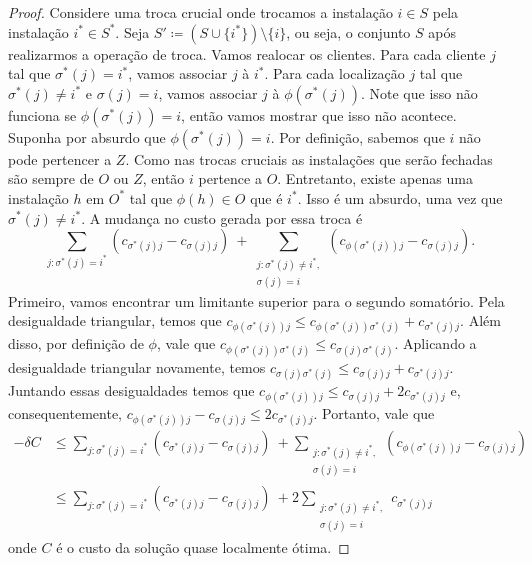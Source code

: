 \begin{proof}
Considere uma troca crucial onde trocamos a instalação $i \in S$ pela instalação $ i^* \in S^*$. Seja $S' \coloneqq (S \cup \{i^*\})\setminus \{i\}$, ou seja, o conjunto $S$ após realizarmos a operação de troca. Vamos realocar os clientes. Para cada cliente $j$ tal que $\sigma^*(j) = i^*$, vamos associar $j$ à $i^*$. Para cada localização $j$ tal que $\sigma^*(j) \neq i^*$ e $\sigma(j)=i$, vamos associar $j$ à $\phi(\sigma^*(j))$. Note que isso não funciona se $\phi(\sigma^*(j)) = i$, então vamos mostrar que isso não acontece. Suponha por absurdo que $\phi(\sigma^*(j))=i$. Por definição, sabemos que $i$ não pode pertencer a $Z$. Como nas trocas cruciais as instalações que serão fechadas são sempre de $O$ ou $Z$, então $i$ pertence a $O$. Entretanto, existe apenas uma instalação $h$ em $O^*$ tal que $\phi(h) \in O$ que é $i^*$. Isso é um absurdo, uma vez que $\sigma^*(j) \neq i^*$. A mudança no custo gerada por essa troca é 
\[ \sum_{j:\sigma^*(j) = i^*} (c_{\sigma^*(j)j} - c_{\sigma(j)j}) \ + \sum_{\substack{j : \sigma^*(j)\neq i^*,\\ \sigma(j) = i}} (c_{\phi(\sigma^*(j))j} - c_{\sigma(j)j}).\]
Primeiro, vamos encontrar um limitante superior para o segundo somatório. Pela desigualdade triangular, temos que $c_{\phi(\sigma^*(j))j} \leq c_{\phi(\sigma^*(j))\sigma^*(j)}+c_{\sigma^*(j)j}$. Além disso, por definição de $\phi$, vale que $c_{\phi(\sigma^*(j))\sigma^*(j)}\leq c_{\sigma(j)\sigma^*(j)}$. Aplicando a desigualdade triangular novamente, temos $c_{\sigma(j)\sigma^*(j)} \leq c_{\sigma(j)j} + c_{\sigma^*(j)j}$. Juntando essas desigualdades temos que $c_{\phi(\sigma^*(j))j} \leq c_{\sigma(j)j} + 2c_{\sigma^*(j)j}$ e, consequentemente, $c_{\phi(\sigma^*(j))j} - c_{\sigma(j)j} \leq 2c_{\sigma^*(j)j}$. Portanto, vale que
\begin{subequations}
\begin{align*}
    - \delta C &\leq \sum_{j:\sigma^*(j) = i^*} (c_{\sigma^*(j)j} - c_{\sigma(j)j}) \ + \sum_{\substack{j : \sigma^*(j)\neq i^*, \\ \sigma(j) = i}} (c_{\phi(\sigma^*(j))j} - c_{\sigma(j)j}) \\
    &\leq \sum_{j:\sigma^*(j) = i^*} (c_{\sigma^*(j)j} - c_{\sigma(j)j}) \ + 2\sum_{\substack{j : \sigma^*(j)\neq i^*,\\ \sigma(j) = i}} c_{\sigma^*(j)j}
\end{align*}
\end{subequations}
onde $C$ é o custo da solução quase localmente ótima.


\end{proof}
